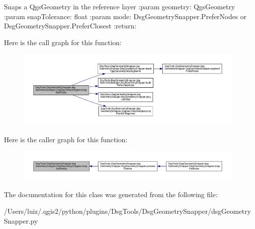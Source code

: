 \begin{DoxyVerb}Snaps a QgsGeometry in the reference layer
:param geometry: QgsGeometry
:param snapTolerance: float
:param mode: DsgGeometrySnapper.PreferNodes or DsgGeometrySnapper.PreferClosest
:return:
\end{DoxyVerb}
 Here is the call graph for this function\+:
\nopagebreak
\begin{figure}[H]
\begin{center}
\leavevmode
\includegraphics[width=350pt]{class_dsg_tools_1_1_dsg_geometry_snapper_1_1dsg_geometry_snapper_1_1_dsg_geometry_snapper_afe06a8fafb4327a2bb278177c2ccdcf5_cgraph}
\end{center}
\end{figure}
Here is the caller graph for this function\+:
\nopagebreak
\begin{figure}[H]
\begin{center}
\leavevmode
\includegraphics[width=350pt]{class_dsg_tools_1_1_dsg_geometry_snapper_1_1dsg_geometry_snapper_1_1_dsg_geometry_snapper_afe06a8fafb4327a2bb278177c2ccdcf5_icgraph}
\end{center}
\end{figure}


The documentation for this class was generated from the following file\+:\begin{DoxyCompactItemize}
\item 
/\+Users/luiz/.\+qgis2/python/plugins/\+Dsg\+Tools/\+Dsg\+Geometry\+Snapper/dsg\+Geometry\+Snapper.\+py\end{DoxyCompactItemize}
